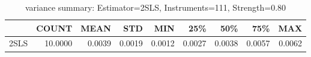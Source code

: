 \begin{table}[ht]
\centering
\caption{variance summary: Estimator=2SLS, Instruments=111, Strength=0.80}
\begin{tabular}{lrrrrrrrr}
\toprule
 & COUNT & MEAN & STD & MIN & 25\% & 50\% & 75\% & MAX \\
\midrule
2SLS & 10.0000 & 0.0039 & 0.0019 & 0.0012 & 0.0027 & 0.0038 & 0.0057 & 0.0062 \\
\bottomrule
\end{tabular}
\end{table}
